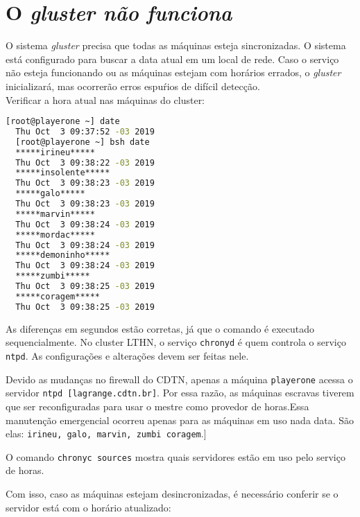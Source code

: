 \chapter{O \textit{gluster não funciona}}

O sistema \textit{gluster} precisa que todas as máquinas esteja sincronizadas. O sistema está configurado para buscar
a data atual em um local de rede. Caso o serviço não esteja funcionando ou as máquinas estejam com horários errados, o \textit{gluster} inicializará, mas ocorrerão erros espuŕios de difícil detecção.\\

Verificar a hora atual nas máquinas do cluster:

\begin{lstlisting}[language=bash,basicstyle=\small]
  [root@playerone ~] date
  Thu Oct  3 09:37:52 -03 2019
  [root@playerone ~] bsh date
  *****irineu*****
  Thu Oct  3 09:38:22 -03 2019
  *****insolente*****
  Thu Oct  3 09:38:23 -03 2019
  *****galo*****
  Thu Oct  3 09:38:23 -03 2019
  *****marvin*****
  Thu Oct  3 09:38:24 -03 2019
  *****mordac*****
  Thu Oct  3 09:38:24 -03 2019
  *****demoninho*****
  Thu Oct  3 09:38:24 -03 2019
  *****zumbi*****
  Thu Oct  3 09:38:25 -03 2019
  *****coragem*****
  Thu Oct  3 09:38:25 -03 2019
\end{lstlisting}

As diferenças em segundos estão corretas, já que o comando é executado sequencialmente.
No cluster LTHN, o serviço \texttt{chronyd} é quem controla o serviço \texttt{ntpd}. As configurações
e alterações devem ser feitas nele.


Devido as mudanças no firewall do CDTN, apenas a máquina \texttt{playerone}
acessa o servidor \texttt{ntpd [lagrange.cdtn.br]}.
Por essa razão, as máquinas escravas tiverem que ser reconfiguradas
para usar o mestre como provedor de horas.Essa manutenção emergencial ocorreu
apenas para as máquinas em uso nada data. São elas: \texttt{irineu, galo, marvin, zumbi coragem}.]

  O comando \texttt{chronyc sources} mostra quais servidores estão em uso pelo serviço de horas.
  
Com isso, caso as máquinas estejam desincronizadas, é necessário conferir se o servidor está com o horário atualizado:



